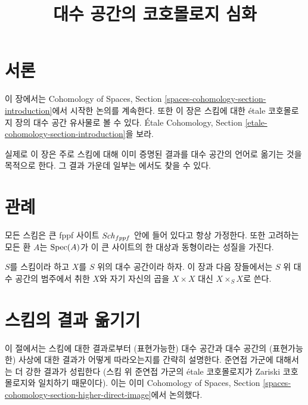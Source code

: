 

%


\title{대수 공간의 코호몰로지 심화}

\maketitle

\label{section-phantom}

\tableofcontents




\section{서론}
\label{section-introduction}

\noindent
이 장에서는 Cohomology of Spaces, Section
\ref{spaces-cohomology-section-introduction}에서 시작한 논의를 계속한다.
또한 이 장은 스킴에 대한 \'etale 코호몰로지 장의 대수 공간 유사물로
볼 수 있다. \'Etale Cohomology, Section
\ref{etale-cohomology-section-introduction}을 보라.

\medskip\noindent
실제로 이 장은 주로 스킴에 대해 이미 증명된 결과를 대수 공간의
언어로 옮기는 것을 목적으로 한다. 그 결과 가운데 일부는
\cite{Kn}에서도 찾을 수 있다.




\section{관례}
\label{section-conventions}

\noindent
모든 스킴은 큰 fppf 사이트 $\mathit{Sch}_{fppf}$ 안에 들어 있다고 항상 가정한다.
또한 고려하는 모든 환 $A$는 $\mathop{\mathrm{Spec}}(A)$가 이 큰 사이트의
한 대상과 동형이라는 성질을 가진다.

\medskip\noindent
$S$를 스킴이라 하고 $X$를 $S$ 위의 대수 공간이라 하자.
이 장과 다음 장들에서는 $S$ 위 대수 공간의 범주에서 취한
$X$와 자기 자신의 곱을 $X \times X$ 대신 $X \times_S X$로 쓴다.






\section{스킴의 결과 옮기기}
\label{section-api}

\noindent
이 절에서는 스킴에 대한 결과로부터 (표현가능한) 대수 공간과
대수 공간의 (표현가능한) 사상에 대한 결과가 어떻게 따라오는지를
간략히 설명한다. 준연접 가군에 대해서는 더 강한 결과가 성립한다
(스킴 위 준연접 가군의 \'etale 코호몰로지가 Zariski 코호몰로지와
일치하기 때문이다). 이는 이미 Cohomology of Spaces, Section
\ref{spaces-cohomology-section-higher-direct-image}에서 논의했다.

